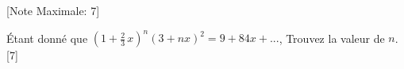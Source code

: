 \begin{question}
  \hspace*{\fill} [Note Maximale: 7]\par
  \medskip
  \noindent Étant donné que $\left(1 + \frac{2}{3}\,x \right)^n(3 + nx)^2 = 9 + 84x + ...$, Trouvez la valeur de $n$.\hspace*{\fill} [7]\par
\end{question}

